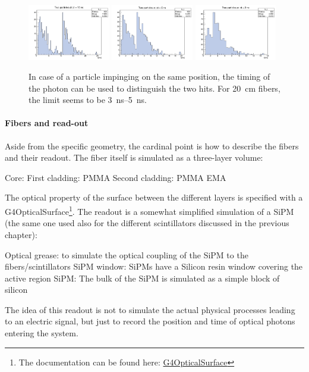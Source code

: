 \begin{refsection}
\begin{figure}
    \centering
    \includegraphics[width=0.32\textwidth]{Figures/muEDM/Tracker/10ns.png}
    \includegraphics[width=0.32\textwidth]{Figures/muEDM/Tracker/5ns.png}
    \includegraphics[width=0.32\textwidth]{Figures/muEDM/Tracker/2ns.png}
    \caption{In case of a particle impinging on the same position, the timing of the photon can be used to distinguish the two hits. For \SI{20}{cm} fibers, the limit seems to be \SIrange{3}{5}{ns}.}
    \label{fig:geant4_time}
\end{figure}

 \paragraph{Fibers and read-out} Aside from the specific geometry, the cardinal point is how to describe the fibers and their readout. 
        The fiber itself is simulated as a three-layer volume:
        \begin{outline}
            \1 Core: 
            \1 First cladding: PMMA
            \1 Second cladding: PMMA EMA
        \end{outline}
        The optical property of the surface between the different layers is specified with a G4OpticalSurface\footnote{The documentation can be found here: \href{https://apc.u-paris.fr/~franco/g4doxy/html/classG4OpticalSurface.html}{G4OpticalSurface}}.
        The readout is a somewhat simplified simulation of a SiPM (the same one used also for the different scintillators discussed in the previous chapter):
        \begin{outline}
            \1 Optical grease: to simulate the optical coupling of the SiPM to the fibers/scintillators
            \1 SiPM window: SiPMs have a Silicon resin window covering the active region
            \1 SiPM: The bulk of the SiPM is simulated as a simple block of silicon
        \end{outline}
        The idea of this readout is not to simulate the actual physical processes leading to an electric signal, but just to record the position and time of optical photons entering the system.



\end{refsection}
